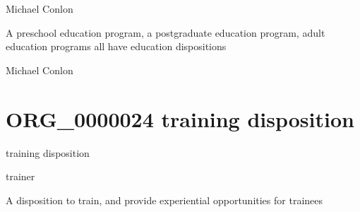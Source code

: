 \documentclass[letterpaper,10pt,english]{sphinxmanual}
\begin{document}
\begin{sphinxShadowBox}

\sphinxAtStartPar
Michael Conlon 
\end{sphinxShadowBox}

\begin{sphinxShadowBox}

\sphinxAtStartPar
A pre\sphinxhyphen{}school education program, a post\sphinxhyphen{}graduate education program, adult education programs all have education dispositions
\end{sphinxShadowBox}

\begin{sphinxShadowBox}

\sphinxAtStartPar
Michael Conlon 
\end{sphinxShadowBox}
\begin{quote}
\label{\detokenize{doc-ORG_0000024:org-0000024}}\label{\detokenize{doc-ORG_0000024:training-disposition}}\label{\detokenize{doc-ORG_0000024:org-0000024}}
\ignorespaces \end{quote}


\section{ORG\_0000024 \sphinxhyphen{} training disposition}
\label{\detokenize{doc-ORG_0000024:org-0000024-training-disposition}}\label{\detokenize{doc-ORG_0000024:index-0}}\label{\detokenize{doc-ORG_0000024::doc}}
\begin{sphinxShadowBox}

\sphinxAtStartPar
training disposition
\end{sphinxShadowBox}

\begin{sphinxShadowBox}

\sphinxAtStartPar
trainer
\end{sphinxShadowBox}

\begin{sphinxShadowBox}

\sphinxAtStartPar
A disposition to train, and provide experiential opportunities for trainees
\end{sphinxShadowBox}
\end{document}
